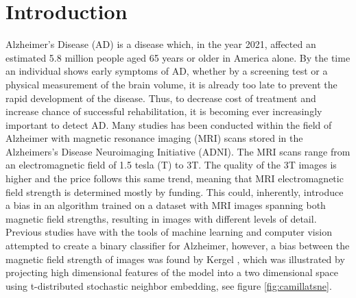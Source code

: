 \documentclass[12pt, fleqn, titlepage]{article}
\newcommand{\1}[1]{\mathds{1}\left[#1\right]}
\begin{document}
\begin{abstract}
	
\end{abstract}

{
\hypersetup{linkcolor=black}
\tableofcontents 
\newpage
}

\section{Introduction} \label{indledning}
Alzheimer’s Disease (AD) is a disease which, in the year 2021, affected an
estimated 5.8 million people aged 65 years or older in America alone. By the
time an individual shows early symptoms of AD, whether by a screening test
or a physical measurement of the brain volume, it is already too late to prevent the rapid development of the disease. Thus, to decrease cost of treatment
and increase chance of successful rehabilitation, it is becoming ever increasingly
important to detect AD. Many studies has been conducted within the field of Alzheimer with magnetic resonance imaging (MRI) scans stored
in the Alzheimers’s Disease Neuroimaging Initiative (ADNI). The MRI scans
range from an electromagnetic field of 1.5 tesla (T) to 3T. The quality of the 3T
images is higher and the price follows this same trend, meaning that MRI electromagnetic field strength is determined mostly by funding. This could, inherently, introduce a bias in an algorithm trained on a dataset with MRI images
spanning both magnetic field strengths, resulting in images with different levels
of detail. Previous studies have with the tools of machine learning and computer vision attempted to create a binary classifier for Alzheimer, however, a bias between the magnetic field strength of images was found by Kergel \cite{CamillaKandidat}, which was illustrated by projecting high dimensional features of the model into a two dimensional space using t-distributed stochastic neighbor embedding, see figure \ref{fig:camillatsne}.
\end{document}

